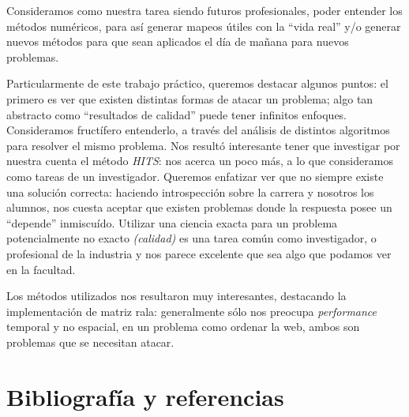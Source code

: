 Consideramos como nuestra tarea siendo futuros profesionales, poder entender los métodos numéricos, para así generar mapeos útiles con la ``vida real'' y/o generar nuevos métodos para que sean aplicados el día de mañana para nuevos problemas.

Particularmente de este trabajo práctico, queremos destacar algunos puntos: el primero es ver que existen distintas formas de atacar un problema; algo tan abstracto como  ``resultados de calidad'' puede tener infinitos enfoques. Consideramos fructífero entenderlo, a través del análisis de distintos algoritmos para resolver el mismo problema. Nos resultó interesante tener que investigar por nuestra cuenta el método \textit{HITS}: nos acerca un poco más, a lo que consideramos como tareas de un investigador. Queremos enfatizar ver que no siempre existe una solución correcta: haciendo introspección sobre la carrera y nosotros los alumnos, nos cuesta aceptar que existen problemas donde la respuesta posee un ``depende'' inmiscuído. Utilizar una ciencia exacta para un problema potencialmente no exacto \textit{(calidad)} es una tarea común como investigador, o profesional de la industria y nos parece excelente que sea algo que podamos ver en la facultad.

Los métodos utilizados nos resultaron muy interesantes, destacando la implementación de matriz rala: generalmente sólo nos preocupa \textit{performance} temporal y no espacial, en un problema como ordenar la web, ambos son problemas que se necesitan atacar. 

\section{Bibliografía y referencias} %

